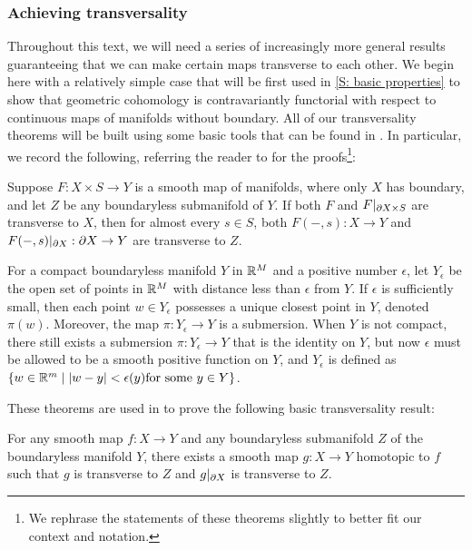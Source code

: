 \subsubsection{Achieving transversality}


Throughout this text, we will need a series of increasingly more general results guaranteeing that we can make certain maps transverse to each other. We begin here with a relatively simple case that will be first used in \cref{S: basic properties} to show that geometric cohomology is contravariantly functorial with respect to continuous maps of manifolds without boundary.
All of our transversality theorems will be built using some basic tools that can be found in \cite[Section 2.3]{GuPo74}. In particular, we record the following, referring the reader to \cite[Section 2.3]{GuPo74} for the proofs\footnote{We rephrase the statements of these theorems slightly to better fit our context and notation.}:

\begin{theorem}
Suppose $F: X\times S\to Y$ is a smooth map of manifolds, where only $X$ has boundary, and let $Z$ be any boundaryless submanifold of $Y$. If both $F$ and $F|_{\partial X\times S}$ are transverse to $X$, then for almost every $s\in S$, both $F(-,s):X\to Y$ and $F(-,s)|_{\partial X}:\partial X\to Y$ are transverse to $Z$.
\end{theorem}

\begin{theorem}
For a compact boundaryless manifold $Y$ in $\mathbb{R}^M$ and a positive number $\epsilon$, let $Y_\epsilon$ be the open set of points in $\mathbb{R}^M$ with distance less than $\epsilon$ from $Y$. If $\epsilon$ is sufficiently small, then each point $w\in Y_\epsilon$ possesses a unique closest point in $Y$, denoted $\pi(w)$. Moreover, the map $\pi:Y_\epsilon\to Y$ is a submersion. When $Y$ is not compact, there still exists a submersion $\pi:Y_\epsilon\to Y$ that is the identity on $Y$, but now $\epsilon$ must be allowed to be a smooth positive function on $Y$, and $Y_\epsilon$ is defined as $\{w\in \mathbb{R}^m \mid |w-y|<\epsilon(y) \text{for some $y\in Y$}\}$.
\end{theorem}

These theorems are used in \cite{GuPo74} to prove the following basic transversality result:

\begin{theorem}
For any smooth map $f:X\to Y$ and any boundaryless submanifold $Z$ of the boundaryless manifold $Y$, there exists a smooth map $g:X\to Y$ homotopic to $f$ such that $g$ is transverse to $Z$ and $g|_{\partial X}$ is transverse to $Z$.
\end{theorem}

